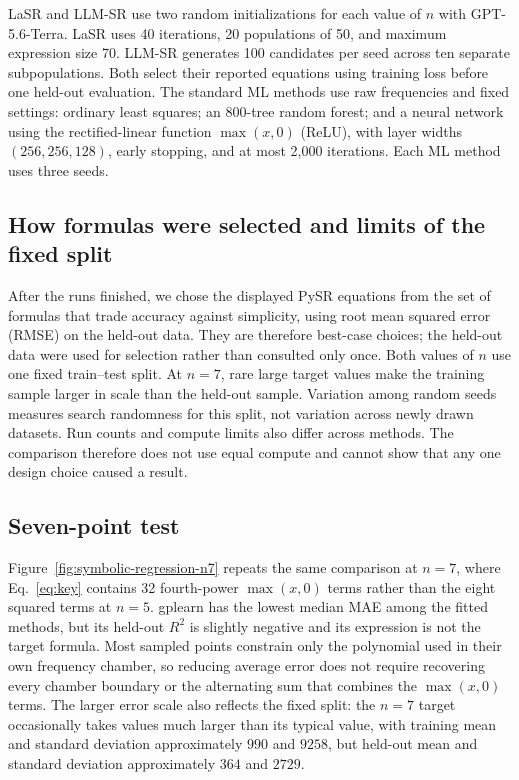 \documentclass{article}
\begin{document}
LaSR and LLM-SR use two random initializations for each value of $n$ with
GPT-5.6-Terra. LaSR uses 40 iterations, 20 populations of 50, and maximum
expression size 70. LLM-SR generates 100 candidates per seed across ten
separate subpopulations. Both select their reported equations using training loss before one
held-out evaluation. The standard ML methods use raw frequencies and fixed
settings: ordinary least squares; an 800-tree random forest; and a neural
network using the rectified-linear function $\max(x,0)$ (ReLU), with layer widths
$(256,256,128)$, early stopping, and at most 2,000
iterations. Each ML method uses three seeds.

\subsection{How formulas were selected and limits of the fixed split}

After the runs finished, we chose the displayed PySR equations from the set of
formulas that trade accuracy against simplicity, using root mean squared error
(RMSE) on the held-out data. They are therefore best-case choices; the
held-out data were used for selection rather than consulted only once. Both
values of $n$ use one fixed train--test split. At
$n=7$, rare large target values make the training sample larger in scale than
the held-out sample. Variation among random seeds measures search randomness
for this split, not variation across newly drawn datasets. Run counts and
compute limits also differ across methods. The comparison therefore does not
use equal compute and cannot show that any one design choice caused a result.

\subsection{Seven-point test}
\label{app:sr-n7}

Figure~\ref{fig:symbolic-regression-n7} repeats the same comparison at
$n=7$, where Eq.~\eqref{eq:key} contains 32 fourth-power
$\max(x,0)$ terms rather than the eight squared terms at $n=5$. gplearn has
the lowest median MAE among the fitted methods, but its held-out $R^2$ is
slightly negative and its expression is not the target formula. Most sampled
points constrain only the polynomial used in their own frequency chamber,
so reducing average error does not require recovering every chamber boundary or
the alternating sum that combines the $\max(x,0)$ terms. The larger
error scale also reflects the fixed split: the $n=7$ target occasionally takes
values much larger than its typical value,
with training mean and standard deviation approximately $990$ and $9258$, but
held-out mean and standard deviation approximately $364$ and $2729$.
\end{document}
